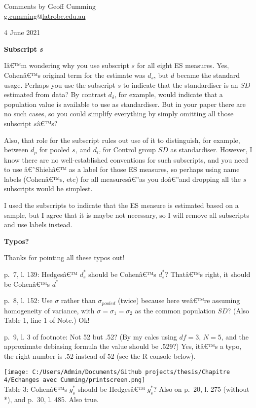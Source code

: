 \begin{appendix}
Comments by Geoff Cumming\\
\underline{g.cumming$@$latrobe.edu.au}

4 June 2021

\textbf{Subscript \emph{s}}

Iâ€™m wondering why you use subscript \(s\) for all eight ES measures.
Yes, Cohenâ€™s original term for the estimate was \(d_s\), but \(d\)
became the standard usage. Perhaps you use the subscript \(s\) to
indicate that the standardiser is an \(SD\) estimated from data? By
contrast \(d_\delta\), for example, would indicate that a population
value is available to use as standardiser. But in your paper there are
no such cases, so you could simplify everything by simply omitting all
those subscript \(sâ€™\)s?

Also, that role for the subscript rules out use of it to distinguish,
for example, between \(d_p\) for pooled \(s\), and \(d_C\) for Control
group \(SD\) as standardiser. However, I know there are no
well-established conventions for such subscripts, and you need to use
â€˜Shiehâ€™ as a label for those ES measures, so perhaps using name
labels (Cohenâ€™s, etc) for all measuresâ€''as you doâ€''and dropping
all the \(s\) subscripts would be simplest.

\color{blue} I used the subscripts to indicate that the ES measure is
estimated based on a sample, but I agree that it is maybe not necessary,
so I will remove all subscripts and use labels instead.

\color{black} \textbf{Typos?}

\color{blue} Thanks for pointing all these typos out!

\color{black} p.~7, l. 139: Hedgesâ€™ \(d_s^*\) should be Cohenâ€™s
\(d_s^*\)? \color{blue}Thatâ€™s right, it should be Cohenâ€™s \(d^*\)

\color{black} p.~8, l. 152: Use \(\sigma\) rather than
\(\sigma_{pooled}\) (twice) because here weâ€™re assuming homogeneity of
variance, with \(\sigma = \sigma_1 = \sigma_2\) as the common population
\(SD\)? (Also Table 1, line 1 of Note.) \color{blue} \color{blue}Ok!

\color{black} p.~9, l. 3 of footnote: Not 52 but .52? (By my calcs using
\(df = 3\), \(N = 5\), and the approximate debiasing formula the value
should be .529?) \color{blue} Yes, itâ€™s a typo, the right number is
.52 instead of 52 (see the R console below).

\texttt{[image: C:/Users/Admin/Documents/Github projects/thesis/Chapitre 4/Echanges avec Cumming/printscreen.png]}\\
\color{black} Table 3: Cohenâ€™s \(g_s^*\) should be Hedgesâ€™
\(g_s^*\)? Also on p.~20, l. 275 (without *), and p.~30, l. 485.
\color{blue} Also true.


\end{appendix}
